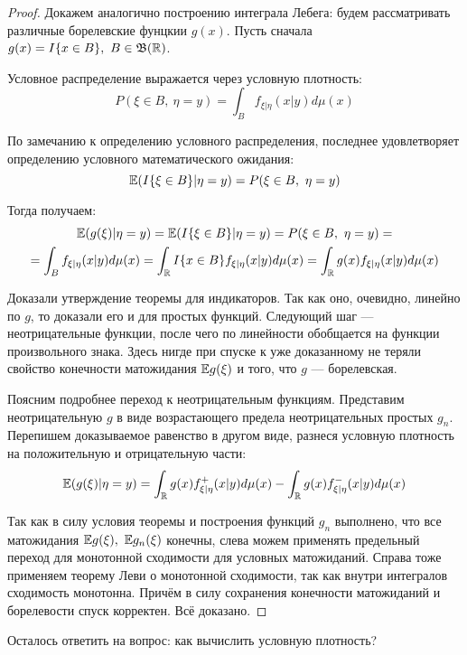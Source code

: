 \begin{proof}
    Докажем аналогично построению интеграла Лебега: будем рассматривать различные борелевские фунцкии $g(x)$. Пусть сначала $g(x) = I\{x \in B\},\ B \in \mathfrak{B}(\mathbb{R})$.
    
    Условное распределение выражается через условную плотность:
    \[
        P(\xi \in B,\ \eta = y) = \int_B f_{\xi | \eta}(x | y) d\mu(x)
    \]

    По замечанию к определению условного распределения, последнее удовлетворяет определению условного математического ожидания:
    \[
        \E(I\{\xi \in B\} | \eta = y) = P(\xi \in B,\ \eta = y)
    \]
    
    Тогда получаем:
    \begin{multline*}
        \mathbb{E}(g(\xi) | \eta=y) = \mathbb{E}(I\{\xi \in B\} | \eta = y) = P(\xi \in B,\ \eta = y) =
        \\
        = \int_B f_{\xi | \eta}(x | y) d\mu(x) = \int_{\mathbb{R}} I\{x \in B\} f_{\xi | \eta}(x | y) d\mu(x) = \int_{\mathbb{R}} g(x) f_{\xi | \eta}(x | y) d\mu(x)
    \end{multline*}

    Доказали утверждение теоремы для индикаторов. Так как оно, очевидно, линейно по $g$, то доказали его и для простых функций. Следующий шаг --- неотрицательные функции, после чего по линейности обобщается на функции произвольного знака. Здесь нигде при спуске к уже доказанному не теряли свойство конечности матожидания $\mathbb{E} g(\xi)$ и того, что $g$ --- борелевская.

    Поясним подробнее переход к неотрицательным функциям. Представим неотрицательную $g$ в виде возрастающего предела неотрицательных простых $g_n$. Перепишем доказываемое равенство в другом виде, разнеся условную плотность на положительную и отрицательную части:
    \[
        \mathbb{E}(g(\xi) | \eta = y) = \int_{\mathbb{R}} g(x) f^+_{\xi | \eta}(x | y) d\mu(x) - \int_{\mathbb{R}} g(x) f^-_{\xi | \eta}(x | y) d\mu(x)
    \]

    Так как в силу условия теоремы и построения функций $g_n$ выполнено, что все матожидания $\mathbb{E} g(\xi),\ \mathbb{E} g_n(\xi)$ конечны, слева можем применять предельный переход для монотонной сходимости для условных матожиданий. Справа тоже применяем теорему Леви о монотонной сходимости, так как внутри интегралов сходимость монотонна. Причём в силу сохранения конечности матожиданий и борелевости спуск корректен. Всё доказано.
\end{proof}

\begin{note}
    Осталось ответить на вопрос: как вычислить условную плотность?
\end{note}

